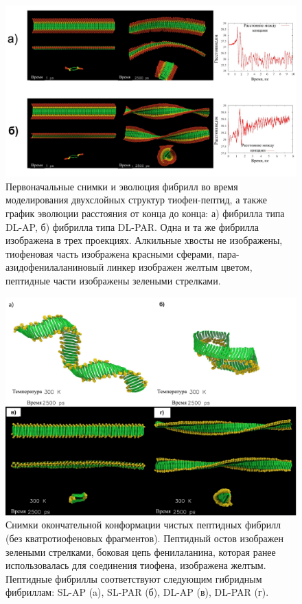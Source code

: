 \begin{figure} [H]
    \centering
    \includegraphics[width=\textwidth]{images/p4/punkt5/part4_p5_f44.pdf}
    \caption[Первоначальные снимки и эволюция фибрилл во время моделирования двухслойных структур тиофен-пептид]{Первоначальные снимки и эволюция фибрилл во время моделирования двухслойных структур тиофен-пептид, а также график эволюции расстояния от конца до конца: а) фибрилла типа DL-AP, б) фибрилла типа DL-PAR. Одна и та же фибрилла изображена в трех проекциях. Алкильные хвосты не изображены, тиофеновая часть изображена красными сферами, пара-азидофенилаланиновый линкер изображен желтым цветом, пептидные части изображены зелеными стрелками.}
    \label{fig:p4_p5_f44}
\end{figure}


\begin{figure} [H]
    \centering
    \includegraphics[width=\textwidth]{images/p4/punkt5/part4_p5_f45.pdf}
    \caption[Снимки окончательной конформации чистых пептидных фибрилл (без кватротиофеновых фрагментов)]{Снимки окончательной конформации чистых пептидных фибрилл (без кватротиофеновых фрагментов). Пептидный остов изображен зелеными стрелками, боковая цепь фенилаланина, которая ранее использовалась для соединения тиофена, изображена желтым. Пептидные фибриллы соответствуют следующим гибридным фибриллам: SL-AP (a), SL-PAR (б), DL-AP (в), DL-PAR (г).}
    \label{fig:p4_p5_f45}
\end{figure}


